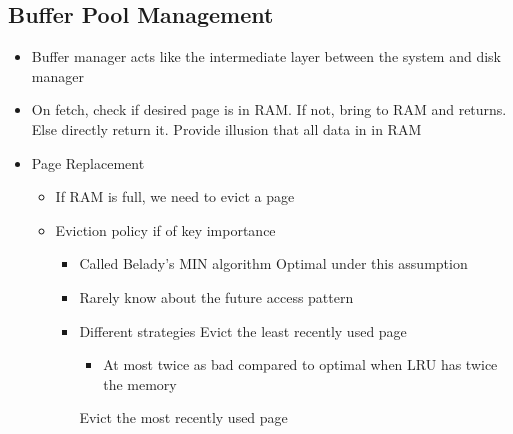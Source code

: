 \subsection{Buffer Pool Management}
\begin{itemize}
    \item Buffer manager acts like the intermediate layer between the system and disk manager
    \item On fetch, check if desired page is in RAM. If not, bring to RAM and returns. Else directly return it.
     Provide illusion that all data in in RAM
    \item Page Replacement
        \begin{itemize}
            \item If RAM is full, we need to evict a page
            \item Eviction policy if of key importance
                \begin{itemize}
                     Evict block whose next access is farthest in the future
                    \item Called Belady's MIN algorithm
                    \ipro Optimal under this assumption
                \end{itemize}
                \begin{itemize}
                    \item Rarely know about the future access pattern
                    \item Different strategies
                     Evict the least recently used page
                        \begin{itemize}
                            \ipro Works well for repeated access to popular pages
                            \icon $100\%$ miss under sequential flooding
                                \begin{itemize}
                                     Access in a repeated pattern but such that not all pages fit into RAM
                                \end{itemize}
                            \item At most twice as bad compared to optimal when LRU has twice the memory 
                        \end{itemize}
                     Evict the most recently used page

\end{itemize}
\end{itemize}
\end{itemize}
